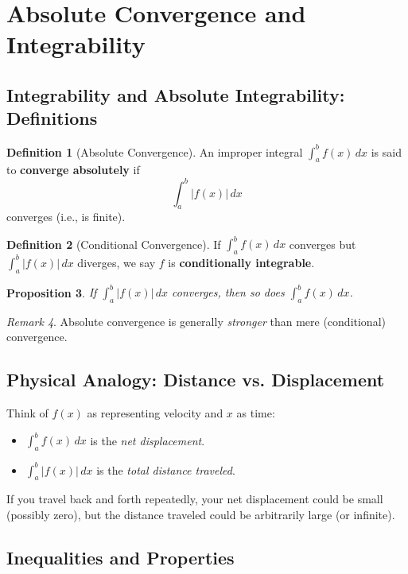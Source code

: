 \documentclass[12pt]{article}
\theoremstyle{definition}
\newtheorem{definition}{Definition}[section]
\theoremstyle{plain}
\newtheorem{proposition}[definition]{Proposition}
\theoremstyle{remark}
\newtheorem{remark}[definition]{Remark}
\begin{document}
\section{Absolute Convergence and Integrability}

\subsection{Integrability and Absolute Integrability: Definitions}

\begin{definition}[Absolute Convergence]
An improper integral $\int_a^b f(x)\,dx$ is said to \textbf{converge absolutely} if
\[
\int_a^b |f(x)|\,dx
\]
converges (i.e., is finite).
\end{definition}

\begin{definition}[Conditional Convergence]
If $\int_a^b f(x)\,dx$ converges but $\int_a^b |f(x)|\,dx$ diverges, we say $f$ is \textbf{conditionally integrable}.
\end{definition}

\begin{proposition}
If $\int_a^b |f(x)|\,dx$ converges, then so does $\int_a^b f(x)\,dx$.
\end{proposition}

\begin{remark}
Absolute convergence is generally \emph{stronger} than mere (conditional) convergence.
\end{remark}

\subsection{Physical Analogy: Distance vs. Displacement}

Think of $f(x)$ as representing velocity and $x$ as time:
\begin{itemize}
    \item $\int_a^b f(x)\,dx$ is the \emph{net displacement}.
    \item $\int_a^b |f(x)|\,dx$ is the \emph{total distance traveled}.
\end{itemize}
If you travel back and forth repeatedly, your net displacement could be small (possibly zero), but the distance traveled could be arbitrarily large (or infinite).

\subsection{Inequalities and Properties}
\end{document}
